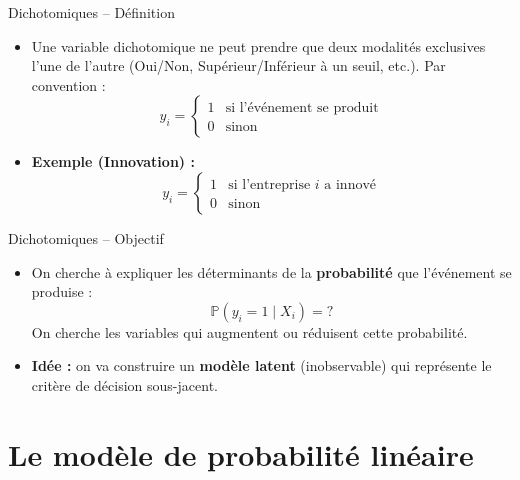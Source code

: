 \documentclass[11pt,aspectratio=169]{beamer}
\newcommand{\Prob}{\mathbb{P}}
\begin{document}
\begin{frame}{Dichotomiques -- Définition}

\begin{itemize}

\item Une variable dichotomique ne peut prendre que deux modalités exclusives l'une de l'autre (Oui/Non, Supérieur/Inférieur à un seuil, etc.). Par convention :
  \[
  y_i = \begin{cases}
      1 & \text{si l'événement se produit} \\
      0 & \text{sinon}
  \end{cases}
  \]\newline

\item \textbf{Exemple (Innovation) :}
  \[
  y_i = \begin{cases}
      1 & \text{si l'entreprise } i \text{ a innové} \\
      0 & \text{sinon}
  \end{cases}
  \]

\end{itemize}

\end{frame}

\begin{frame}{Dichotomiques -- Objectif}

\begin{itemize}

\item On cherche à expliquer les déterminants de la \textbf{probabilité} que l'événement se produise :
  \[
  \Prob(y_i = 1 \mid X_i) = \text{?}
  \]
  On cherche les variables qui augmentent ou réduisent cette probabilité.\newline

\item \textbf{Idée :} on va construire un \textbf{modèle latent} (inobservable) qui représente le critère de décision sous-jacent.

\end{itemize}

\end{frame}

\section{Le modèle de probabilité linéaire}
\end{document}
